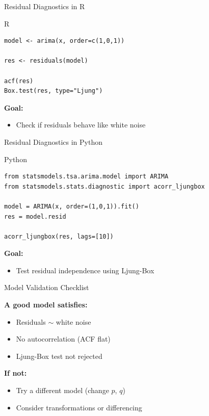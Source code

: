 \documentclass[aspectratio=169]{beamer}
\begin{document}
\begin{frame}[fragile]{Residual Diagnostics in R}
\small

\begin{block}{R}
\begin{verbatim}
model <- arima(x, order=c(1,0,1))

res <- residuals(model)

acf(res)
Box.test(res, type="Ljung")
\end{verbatim}
\end{block}

\vspace{0.3cm}

\textbf{Goal:}
\begin{itemize}
    \item Check if residuals behave like white noise
\end{itemize}

\end{frame}

\begin{frame}[fragile]{Residual Diagnostics in Python}
\small

\begin{block}{Python}
\begin{verbatim}
from statsmodels.tsa.arima.model import ARIMA
from statsmodels.stats.diagnostic import acorr_ljungbox

model = ARIMA(x, order=(1,0,1)).fit()
res = model.resid

acorr_ljungbox(res, lags=[10])
\end{verbatim}
\end{block}

\vspace{0.3cm}

\textbf{Goal:}
\begin{itemize}
    \item Test residual independence using Ljung-Box
\end{itemize}

\end{frame}



\begin{frame}{Model Validation Checklist}

\textbf{A good model satisfies:}

\begin{itemize}
    \item Residuals $\sim$ white noise
    \item No autocorrelation (ACF flat)
    \item Ljung-Box test not rejected
\end{itemize}

\vspace{0.4cm}

\textbf{If not:}
\begin{itemize}
    \item Try a different model (change $p$, $q$)
    \item Consider transformations or differencing
\end{itemize}

\end{frame}
\end{document}
